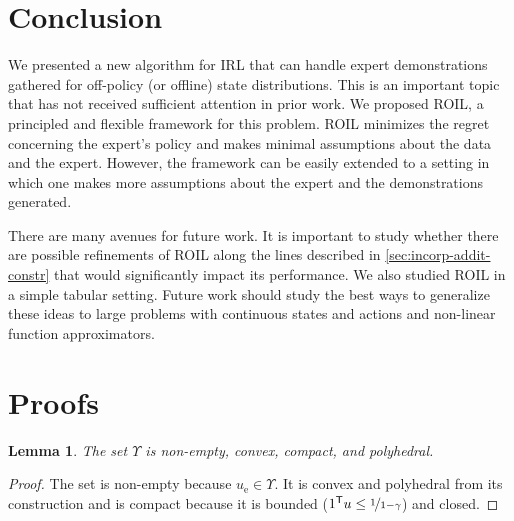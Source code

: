 \documentclass[10pt]{article}
\renewcommand{\cite}{\citep}
\theoremstyle{plain}
\newtheorem{lemma}{Lemma}
\theoremstyle{remark}
\newcommand{\gersi}[1]{\textcolor{red}{[#1]}}
\begin{document}
\section{Conclusion}

We presented a new algorithm for IRL that can handle expert demonstrations gathered for off-policy (or offline) state distributions. This is an important topic that has not received sufficient attention in prior work. We proposed ROIL, a principled and flexible framework for this problem. ROIL minimizes the regret concerning the expert's policy and makes minimal assumptions about the data and the expert. However, the framework can be easily extended to a setting in which one makes more assumptions about the expert and the demonstrations generated.

There are many avenues for future work. It is important to study whether there are possible refinements of ROIL along the lines described in \cref{sec:incorp-addit-constr} that would significantly impact its performance. We also studied ROIL in a simple tabular setting. Future work should study the best ways to generalize these ideas to large problems with continuous states and actions and non-linear function approximators. 

%


\clearpage
\appendix
\section{Proofs} %
\label{sec:appendix_proofs}
\begin{lemma}\label{prop:convexity_of_Upsilon}
The set $\Upsilon$ is non-empty, convex, compact, and polyhedral.
\end{lemma}
\begin{proof}
The set is non-empty because $u_{\mathrm{e}} \in \Upsilon$. It is convex and polyhedral from its construction and is compact because it is bounded ($1^{\mathsf{T}} u \le  \nicefrac{1}{1-\gamma}$) and closed.  
\end{proof}
\end{document}
